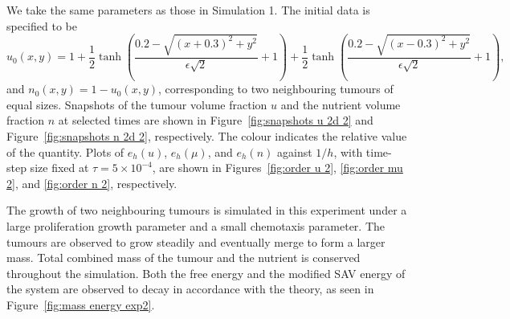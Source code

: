 \documentclass[11pt, reqno]{amsart}
\theoremstyle{definition}
\numberwithin{equation}{section}
\begin{document}
We take the same parameters as those in Simulation 1. The initial data is specified to be
\[
    u_0(x,y)= 1+ \frac12 \tanh\left(\frac{0.2-\sqrt{(x+0.3)^2+y^2}}{\epsilon\sqrt{2}} +1\right) + \frac12 \tanh\left(\frac{0.2-\sqrt{(x-0.3)^2+y^2}}{\epsilon\sqrt{2}} +1\right),
\]
and $n_0(x,y)=1-u_0(x,y)$,
corresponding to two neighbouring tumours of equal sizes.
Snapshots of the tumour volume fraction $u$ and the nutrient volume fraction $n$ at selected times are shown in Figure~\ref{fig:snapshots u 2d 2} and Figure~\ref{fig:snapshots n 2d 2}, respectively. The colour indicates the relative value of the quantity. Plots of $e_h(u)$, $e_h(\mu)$, and $e_h(n)$ against $1/h$, with time-step size fixed at $\tau=5\times 10^{-4}$, are shown in Figures~\ref{fig:order u 2}, \ref{fig:order mu 2}, and \ref{fig:order n 2}, respectively.

The growth of two neighbouring tumours is simulated in this experiment under a large proliferation growth parameter and a small chemotaxis parameter. The tumours are observed to grow steadily and eventually merge to form a larger mass. Total combined mass of the tumour and the nutrient is conserved throughout the simulation. Both the free energy and the modified SAV energy of the system are observed to decay in accordance with the theory, as seen in Figure~\ref{fig:mass energy exp2}.
\end{document}
